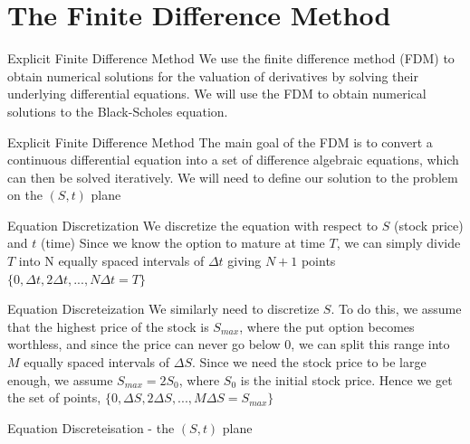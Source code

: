 \section{The Finite Difference Method}

\begin{frame}{Explicit Finite Difference Method}
    We use the finite difference method (FDM) to obtain numerical solutions for the valuation of derivatives by solving their underlying differential equations. \newline
    We will use the FDM to obtain numerical solutions to the Black-Scholes equation.
\end{frame}

\begin{frame}{Explicit Finite Difference Method}
    The main goal of the FDM is to convert a continuous differential equation into a set of difference algebraic equations, which can then be solved iteratively.
    \newline
    We will need to define our solution to the problem on the $(S,t)$ plane
\end{frame}

\begin{frame}{Equation Discretization}
    We discretize the equation with respect to $S$ (stock price) and $t$ (time)
    \newline
    Since we know the option to mature at time $T$, we can simply divide $T$ into N equally spaced intervals of $\Delta{t}$ giving $N+1$ points
    $\{0,\Delta{t},2\Delta{t}, ... , N\Delta{t}=T\}$
\end{frame}

\begin{frame}{Equation Discreteization}
    We similarly need to discretize $S$. To do this, we assume that the highest price of the stock is $S_{max}$, where the put option becomes worthless, and since the price can never go below 0, we can split this range into $M$ equally spaced intervals of $\Delta S$.
    \newline
    Since we need the stock price to be large enough, we assume $S_{max}=2S_{0}$, where $S_{0}$ is the initial stock price. Hence we get the set of points,
    $\{0,\Delta{S},2\Delta{S}, ... , M\Delta{S}=S_{max}\}$
\end{frame}


\begin{frame}{Equation Discreteisation - the $(S,t)$ plane}
    
\end{frame}